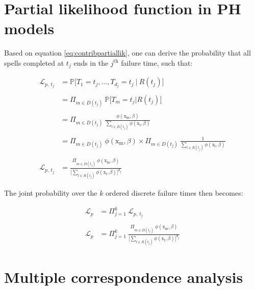 \documentclass[
]{book}
\begin{document}
\hypertarget{partial-likelihood-function-in-ph-models}{%
\section*{Partial likelihood function in PH models}\label{partial-likelihood-function-in-ph-models}}

Based on equation \eqref{eq:contribpartiallik}, one can derive the probability that all spells completed at \(t_j\) ends in the \(j^{\text{th}}\) failure time, such that:

\begin{equation}
\begin{aligned}
  \mathcal{L}_{p,\ t_j} & = \mathbb{P}\big[T_1 = t_j, \dots, T_{d_j} = t_j \ | \ R(t_j)\big] \\\\
  & = \Pi_{m \in D(t_j)} \ \mathbb{P}\big[T_m = t_j | R(t_j) \big] \\\\
  & = \Pi_{m \in D(t_j)} \ \frac{\phi(\mathrm{x_m}, \beta)}{\sum_{l \in R(t_j)} \phi(\mathrm{x_l}, \beta)} \\\\
  & = \Pi_{m \in D(t_j)} \ \phi(\mathrm{x_m}, \beta) \times \Pi_{m \in D(t_j)} \ \frac{1}{\sum_{l \in R(t_j)} \phi(\mathrm{x_l}, \beta)} \\\\
  \mathcal{L}_{p,\ t_j} & = \frac{\Pi_{m \in D(t_j)} \ \phi(\mathrm{x_m}, \beta)}{\Big[\sum_{l \in R(t_j)} \phi(\mathrm{x_l}, \beta)\Big]^{d_j}}
\end{aligned}
\label{eq:partlikproof}
\end{equation}

The joint probability over the \(k\) ordered discrete failure times then becomes:

\begin{equation}
\begin{aligned}
  \mathcal{L}_p & = \Pi_{j=1}^{k} \ \mathcal{L}_{p,\ t_j} \\\\
  \mathcal{L}_p & = \Pi_{j=1}^{k} \ \frac{\Pi_{m \in D(t_j)} \ \phi(\mathrm{x_m}, \beta)}{\Big[\sum_{l \in R(t_j)} \phi(\mathrm{x_l}, \beta)\Big]^{d_j}}
\end{aligned}
\label{eq:partlikproofbis}
\end{equation}

\hypertarget{mcaappendix}{%
\section*{Multiple correspondence analysis}\label{mcaappendix}}
\end{document}
